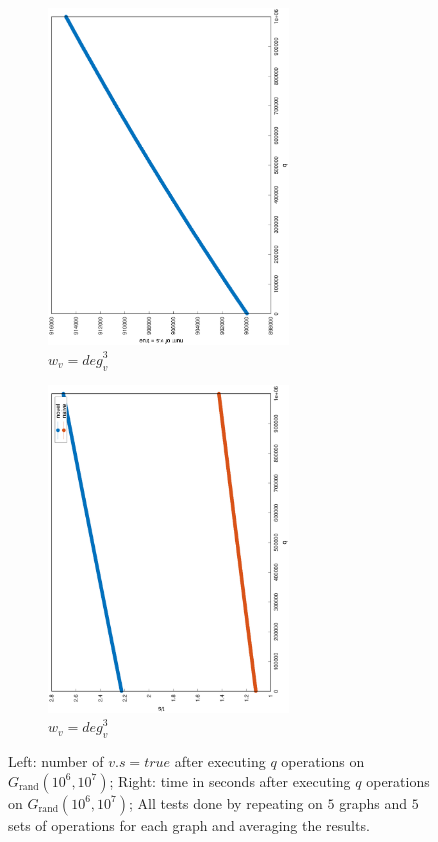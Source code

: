 \documentclass[12pt]{report}
\begin{document}
\begin{figure}
\begin{subfigure}{0.35\textwidth}
	\includegraphics[width=0.7\textwidth,angle=-90]{graph/uniform_coverage_1000000_10000000_0.1_power_3.eps}
	\caption{$ w_v = \mathit{deg}_v^3 $}
\end{subfigure}
\begin{subfigure}{0.35\textwidth}
	\includegraphics[width=0.7\textwidth,angle=-90]{graph/uniform_q_1000000_10000000_0.1_power_3.eps}
	\caption{$ w_v = \mathit{deg}_v^3 $}
\end{subfigure}
	\caption{Left: number of $ v.s = \textit{true} $ after executing $ q $ operations on $ G_\mathrm{rand}(10^6, 10^7) $;
	         Right: time in seconds after executing $ q $ operations on $ G_\mathrm{rand}(10^6, 10^7) $;
			 All tests done by repeating on $ 5 $ graphs and $ 5 $ sets of operations for each graph and averaging the results.}
\end{figure}
\end{document}
